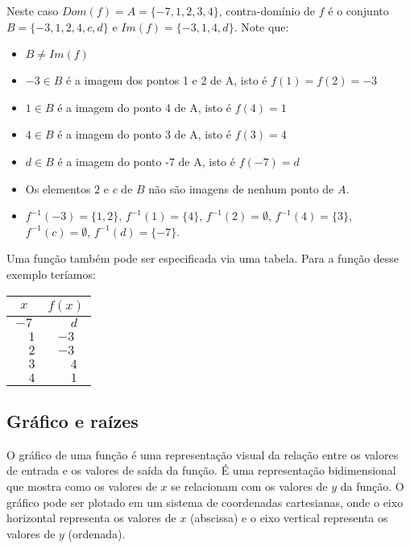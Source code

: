 \documentclass[12pt]{article}
\begin{document}
Neste caso $Dom(f) = A = \{-7, 1, 2, 3, 4\}$, contra-domínio de $f$ é o conjunto $B = \{-3, 1, 2, 4, c, d\}$ e $Im(f) = \{-3, 1, 4, d\}$. Note que:
\begin{itemize}
    \item $B \neq Im(f)$
    \item $-3 \in B$ é a imagem dos pontos 1 e 2 de A, isto é $f(1) = f(2) = -3$
    \item $1 \in B$ é a imagem do ponto 4 de A, isto é $f(4) = 1$
    \item $4 \in B$ é a imagem do ponto 3 de A, isto é $f(3) = 4$
    \item $d \in B$ é a imagem do ponto -7 de A, isto é $f(-7) = d$
    \item Os elementos $2$ e $c$ de $B$ não são imagens de nenhum ponto de $A$.
    \item $f^{-1}(-3) = \{1, 2\}$, $f^{-1}(1) = \{4\}$, $f^{-1}(2) = \emptyset$, $f^{-1}(4) = \{3\}$, $f^{-1}(c) = \emptyset$, $f^{-1}(d) = \{-7\}$.
\end{itemize}

Uma função também pode ser especificada via uma tabela. Para a função desse exemplo teríamos:
\\
\begin{center}
    \begin{tabular}{|c|c|}
        \hline
        $x$             &          $f(x)$ \\
        \hline
                  $-7$  &  $\phantom{-}d$ \\
        $\phantom{-}1$  &            $-3$ \\
        $\phantom{-}2$  &            $-3$ \\
        $\phantom{-}3$  &  $\phantom{-}4$ \\
        $\phantom{-}4$  &  $\phantom{-}1$ \\
        \hline
    \end{tabular}
\end{center}

\subsection{Gráfico e raízes}

O gráfico de uma função é uma representação visual da relação entre os valores de entrada e os valores de saída da função. É uma representação bidimensional que mostra como os valores de $x$ se relacionam com os valores de $y$ da função.
O gráfico pode ser plotado em um sistema de coordenadas cartesianas, onde o eixo horizontal representa os valores de $x$  (abscissa) e o eixo vertical representa os valores de $y$ (ordenada).
\end{document}
